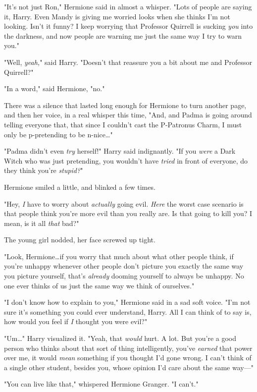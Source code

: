 "It’s not just Ron," Hermione said in almost a whisper. "Lots of people are
saying it, Harry. Even Mandy is giving me worried looks when she thinks I’m not
looking. Isn’t it funny? I keep worrying that Professor Quirrell is sucking
\emph{you} into the darkness, and now people are warning me just the same way I
try to warn you."

"Well, \emph{yeah,}" said Harry. "Doesn’t that reassure you a bit about me and
Professor Quirrell?"

"In a word," said Hermione, "no."

There was a silence that lasted long enough for Hermione to turn another page,
and then her voice, in a real whisper this time, "And, and Padma is going
around telling everyone that, that since I couldn’t cast the P-Patronus Charm,
I must only be p-pretending to be n-nice…"

"Padma didn’t even \emph{try} herself!" Harry said indignantly. "If you
\emph{were} a Dark Witch who was just pretending, you wouldn’t have
\emph{tried} in front of everyone, do they think you’re \emph{stupid?}"

Hermione smiled a little, and blinked a few times.

"Hey, \emph{I} have to worry about \emph{actually} going evil. \emph{Here} the
worst case scenario is that people think you’re more evil than you really are.
Is that going to kill you? I mean, is it all \emph{that} bad?"

The young girl nodded, her face screwed up tight.

"Look, Hermione…if you worry that much about what other people think,
if you’re unhappy whenever other people don’t picture you exactly the same way
you picture yourself, that’s \emph{already} dooming yourself to always be
unhappy. No one ever thinks of us just the same way we think of ourselves."

"I don’t know how to explain to you," Hermione said in a sad soft voice. "I’m
not sure it’s something you could ever understand, Harry. All I can think of to
say is, how would you feel if \emph{I} thought you were evil?"

"Um…" Harry visualized it. "Yeah, that \emph{would} hurt. A lot. But
you’re a good person who thinks about that sort of thing intelligently, you’ve
\emph{earned} that power over me, it would \emph{mean} something if you thought
I’d gone wrong. I can’t think of a single other student, besides you, whose
opinion I’d care about the same way—"

"You can live like that," whispered Hermione Granger. "I can’t."

